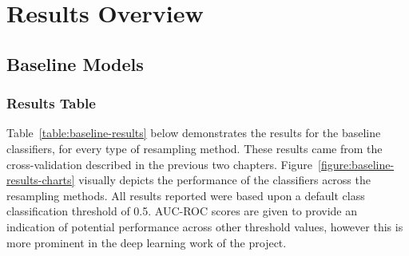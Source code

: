 \documentclass[12pt,a4paper,twoside]{report}
\begin{document}
\section{Results Overview}
\subsection{Baseline Models}
\subsubsection{Results Table}

Table~\ref{table:baseline-results} below demonstrates the results for the baseline classifiers, for every type of resampling method. These results came from the cross-validation described in the previous two chapters. Figure~\ref{figure:baseline-results-charts} visually depicts the performance of the classifiers across the resampling methods. All results reported were based upon a default class classification threshold of 0.5. AUC-ROC scores are given to provide an indication of potential performance across other threshold values, however this is more prominent in the deep learning work of the project. 
\end{document}
